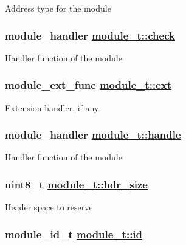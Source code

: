 Address type for the module \hypertarget{structmodule__t_ec8448cc809c87a4e86ed8534c3300af}{
\subsubsection[check]{\setlength{\rightskip}{0pt plus 5cm}module\_\-handler \hyperlink{structmodule__t_ec8448cc809c87a4e86ed8534c3300af}{module\_\-t::check}}}
\label{structmodule__t_ec8448cc809c87a4e86ed8534c3300af}


Handler function of the module \hypertarget{structmodule__t_04a569e519ee33f1391361047922fd2b}{
\subsubsection[ext]{\setlength{\rightskip}{0pt plus 5cm}module\_\-ext\_\-func \hyperlink{structmodule__t_04a569e519ee33f1391361047922fd2b}{module\_\-t::ext}}}
\label{structmodule__t_04a569e519ee33f1391361047922fd2b}


Extension handler, if any \hypertarget{structmodule__t_2508e1e27ce2fbddbfb5aefcd5406bfb}{
\subsubsection[handle]{\setlength{\rightskip}{0pt plus 5cm}module\_\-handler \hyperlink{structmodule__t_2508e1e27ce2fbddbfb5aefcd5406bfb}{module\_\-t::handle}}}
\label{structmodule__t_2508e1e27ce2fbddbfb5aefcd5406bfb}


Handler function of the module \hypertarget{structmodule__t_7641f6a11d4b3c82e2fc045b9c3cf0aa}{
\subsubsection[hdr\_\-size]{\setlength{\rightskip}{0pt plus 5cm}uint8\_\-t \hyperlink{structmodule__t_7641f6a11d4b3c82e2fc045b9c3cf0aa}{module\_\-t::hdr\_\-size}}}
\label{structmodule__t_7641f6a11d4b3c82e2fc045b9c3cf0aa}


Header space to reserve \hypertarget{structmodule__t_adfde6094c8c16eeeea923ddb5a958db}{
\subsubsection[id]{\setlength{\rightskip}{0pt plus 5cm}module\_\-id\_\-t \hyperlink{structmodule__t_adfde6094c8c16eeeea923ddb5a958db}{module\_\-t::id}}}
\label{structmodule__t_adfde6094c8c16eeeea923ddb5a958db}


